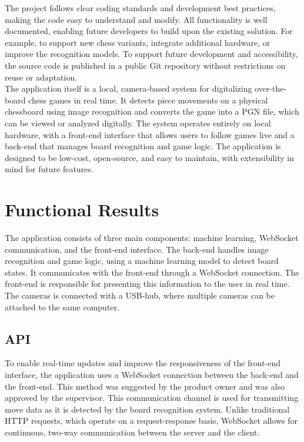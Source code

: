 The project follows clear coding standards and development best practices, making the code easy to understand and modify. All functionality is well documented, enabling future developers to build upon the existing solution. For example, to support new chess variants, integrate additional hardware, or improve the recognition models. To support future development and accessibility, the source code is published in a public Git repository without restrictions on reuse or adaptation. \\

The application itself is a local, camera-based system for digitalizing over-the-board chess games in real time. It detects piece movements on a physical chessboard using image recognition and converts the game into a PGN file, which can be viewed or analyzed digitally. The system operates entirely on local hardware, with a front-end interface that allows users to follow games live and a back-end that manages board recognition and game logic. The application is designed to be low-cost, open-source, and easy to maintain, with extensibility in mind for future features.

\section{Functional Results}
The application consists of three main components: machine learning, WebSocket communication, and the front-end interface. The back-end handles image recognition and game logic, using a machine learning model to detect board states. It communicates with the front-end through a WebSocket connection. The front-end is responsible for presenting this information to the user in real time. The cameras is connected with a USB-hub, where multiple cameras can be attached to the same computer. 

\subsection{API}
To enable real-time updates and improve the responsiveness of the front-end interface, the application uses a WebSocket connection between the back-end and the front-end. This method was suggested by the product owner and was also approved by the supervisor. This communication channel is used for transmitting move data as it is detected by the board recognition system. Unlike traditional HTTP requests, which operate on a request-response basis, WebSocket allows for continuous, two-way communication between the server and the client. \\


